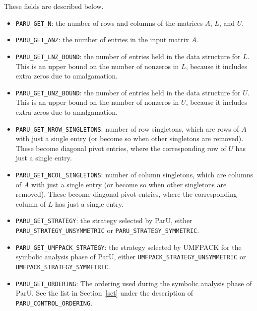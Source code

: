 \documentclass[12pt]{article}
\begin{document}
These fields are described below.

\begin{itemize}

\item \verb'PARU_GET_N': the number of rows and columns of the
    matrices $A$, $L$, and $U$.

\item \verb'PARU_GET_ANZ': the number of entries in the input matrix $A$.

\item \verb'PARU_GET_LNZ_BOUND': the number of entries held in the data
    structure for $L$.  This is an upper bound on the number of nonzeros
    in $L$, because it includes extra zeros due to amalgamation.

\item \verb'PARU_GET_UNZ_BOUND': the number of entries held in the data
    structure for $U$.  This is an upper bound on the number of nonzeros
    in $U$, because it includes extra zeros due to amalgamation.

\item \verb'PARU_GET_NROW_SINGLETONS': number of row singletons, which
    are rows of $A$ with just a single entry (or become so when other
    singletons are removed).  These become diagonal pivot entries,
    where the corresponding row of $U$ has just a single entry.

\item \verb'PARU_GET_NCOL_SINGLETONS': number of column singletons, which
    are columns of $A$ with just a single entry (or become so when other
    singletons are removed).  These become diagonal pivot entries,
    where the corresponding column of $L$ has just a single entry.

\item \verb'PARU_GET_STRATEGY': the strategy selected by ParU, either
    \verb'PARU_STRATEGY_UNSYMMETRIC' or
    \verb'PARU_STRATEGY_SYMMETRIC'.

\item \verb'PARU_GET_UMFPACK_STRATEGY': the strategy selected by
    UMFPACK for the symbolic analysis phase of ParU, either
    \verb'UMFPACK_STRATEGY_UNSYMMETRIC' or \newline
    \verb'UMFPACK_STRATEGY_SYMMETRIC'.

\item \verb'PARU_GET_ORDERING':
    The ordering used during the symbolic analysis phase of ParU.
    See the list in Section~\ref{set} under the description of
    \verb'PARU_CONTROL_ORDERING'.


\end{itemize}
\end{document}
